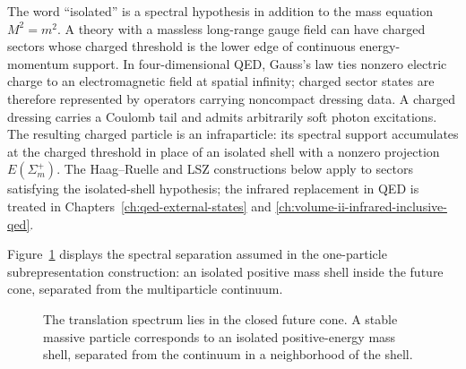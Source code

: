 \begin{remark}
\label{rem:infraparticle-sectors-chapter-two}
The word ``isolated'' is a spectral hypothesis in addition to the mass equation
\(M^2=m^2\).  A theory with a massless long-range gauge field can have charged
sectors whose charged threshold is the lower edge of continuous
energy-momentum support.  In four-dimensional QED, Gauss's law ties nonzero
electric charge to an electromagnetic field at spatial infinity; charged
sector states are therefore represented by operators carrying noncompact
dressing data.  A charged dressing carries a Coulomb tail and admits
arbitrarily soft photon excitations.  The resulting charged particle is an
infraparticle: its spectral support accumulates at the charged threshold in
place of an isolated shell with a nonzero projection \(E(\Sigma_m^+)\).  The
Haag--Ruelle and LSZ constructions below apply to sectors satisfying the
isolated-shell hypothesis; the infrared replacement in QED is treated in
Chapters~\ref{ch:qed-external-states} and
\ref{ch:volume-ii-infrared-inclusive-qed}.
\end{remark}

Figure~\ref{fig:translation-spectrum-mass-shell} displays the spectral
separation assumed in the one-particle subrepresentation construction: an
isolated positive mass shell inside the future cone, separated from the
multiparticle continuum.

\begin{figure}[H]
  \centering
  \caption{The translation spectrum lies in the closed future cone.  A stable
  massive particle corresponds to an isolated positive-energy mass shell,
  separated from the continuum in a neighborhood of the shell.}
  \label{fig:translation-spectrum-mass-shell}
\end{figure}

